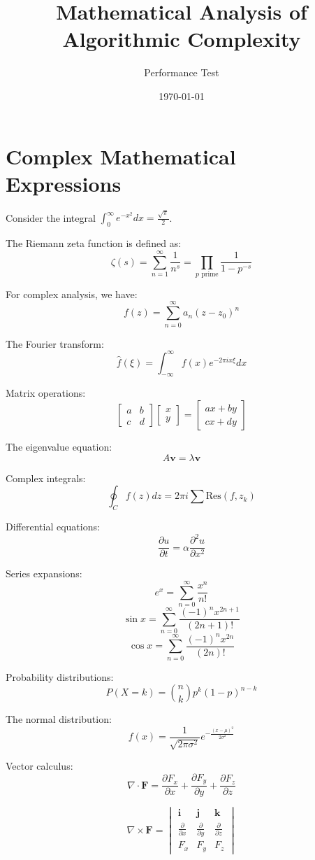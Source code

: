 \documentclass[11pt]{article}
\title{Mathematical Analysis of Algorithmic Complexity}
\author{Performance Test}
\date{\today}
\begin{document}
\maketitle

\section{Complex Mathematical Expressions}

Consider the integral $\int_0^\infty e^{-x^2} dx = \frac{\sqrt{\pi}}{2}$.

The Riemann zeta function is defined as:
$$\zeta(s) = \sum_{n=1}^{\infty} \frac{1}{n^s} = \prod_{p \text{ prime}} \frac{1}{1-p^{-s}}$$

For complex analysis, we have:
$$f(z) = \sum_{n=0}^{\infty} a_n (z-z_0)^n$$

The Fourier transform:
$$\hat{f}(\xi) = \int_{-\infty}^{\infty} f(x) e^{-2\pi i x \xi} dx$$

Matrix operations:
$$\begin{bmatrix} a & b \\ c & d \end{bmatrix} \begin{bmatrix} x \\ y \end{bmatrix} = \begin{bmatrix} ax + by \\ cx + dy \end{bmatrix}$$

The eigenvalue equation:
$$A\mathbf{v} = \lambda\mathbf{v}$$

Complex integrals:
$$\oint_C f(z) dz = 2\pi i \sum \text{Res}(f, z_k)$$

Differential equations:
$$\frac{\partial u}{\partial t} = \alpha \frac{\partial^2 u}{\partial x^2}$$

Series expansions:
$$e^x = \sum_{n=0}^{\infty} \frac{x^n}{n!}$$
$$\sin x = \sum_{n=0}^{\infty} \frac{(-1)^n x^{2n+1}}{(2n+1)!}$$
$$\cos x = \sum_{n=0}^{\infty} \frac{(-1)^n x^{2n}}{(2n)!}$$

Probability distributions:
$$P(X = k) = \binom{n}{k} p^k (1-p)^{n-k}$$

The normal distribution:
$$f(x) = \frac{1}{\sqrt{2\pi\sigma^2}} e^{-\frac{(x-\mu)^2}{2\sigma^2}}$$

Vector calculus:
$$\nabla \cdot \mathbf{F} = \frac{\partial F_x}{\partial x} + \frac{\partial F_y}{\partial y} + \frac{\partial F_z}{\partial z}$$

$$\nabla \times \mathbf{F} = \begin{vmatrix} \mathbf{i} & \mathbf{j} & \mathbf{k} \\ \frac{\partial}{\partial x} & \frac{\partial}{\partial y} & \frac{\partial}{\partial z} \\ F_x & F_y & F_z \end{vmatrix}$$
\end{document}
